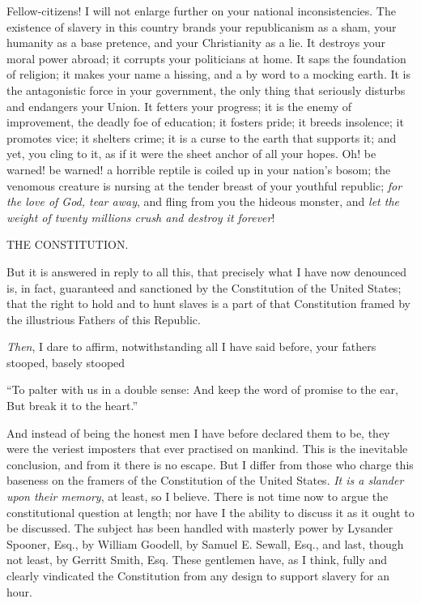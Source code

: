 Fellow-citizens! I will not enlarge further on your national inconsistencies. The existence of slavery in this country brands your republicanism as a sham, your humanity as a base pretence, and your Christianity as a lie. It destroys your moral power abroad; it corrupts your politicians at home. It saps the foundation of religion; it makes your name a hissing, and a by word to a mocking earth. It is the antagonistic force in your government, the only thing that seriously disturbs and endangers your Union. It fetters your progress; it is the enemy of improvement, the deadly foe of education; it fosters pride; it breeds insolence; it promotes vice; it shelters crime; it is a curse to the earth that supports it; and yet, you cling to it, as if it were the sheet anchor of all your hopes. Oh! be warned! be warned! a horrible reptile is coiled up in your nation’s bosom; the venomous creature is nursing at the tender breast of your youthful republic; \textit{for the love of God, tear away}, and fling from you the hideous monster, and \textit{let the weight of twenty millions crush and destroy it forever}!\par

THE CONSTITUTION.\par

But it is answered in reply to all this, that precisely what I have now denounced is, in fact, guaranteed and sanctioned by the Constitution of the United States; that the right to hold and to hunt slaves is a part of that Constitution framed by the illustrious Fathers of this Republic.\par

\textit{Then}, I dare to affirm, notwithstanding all I have said before, your fathers stooped, basely stooped\par

“To palter with us in a double sense: And keep the word of promise to the ear, But break it to the heart.”\par

And instead of being the honest men I have before declared them to be, they were the veriest imposters that ever practised on mankind. This is the inevitable conclusion, and from it there is no escape. But I differ from those who charge this baseness on the framers of the Constitution of the United States. \textit{It is a slander upon their memory}, at least, so I believe. There is not time now to argue the constitutional question at length; nor have I the ability to discuss it as it ought to be discussed. The subject has been handled with masterly power by Lysander Spooner, Esq., by William Goodell, by Samuel E. Sewall, Esq., and last, though not least, by Gerritt Smith, Esq. These gentlemen have, as I think, fully and clearly vindicated the Constitution from any design to support slavery for an hour.\par

